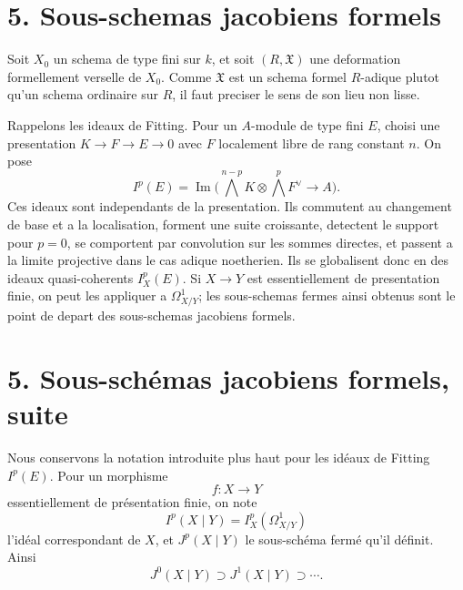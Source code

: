 \documentclass[11pt]{article}
\begin{document}
\section*{5. Sous-schemas jacobiens formels}

Soit \(X_0\) un schema de type fini sur \(k\), et soit \((R,\mathfrak X)\) une deformation formellement verselle de \(X_0\). Comme \(\mathfrak X\) est un schema formel \(R\)-adique plutot qu'un schema ordinaire sur \(R\), il faut preciser le sens de son lieu non lisse.

Rappelons les ideaux de Fitting. Pour un \(A\)-module de type fini \(E\), choisi une presentation \(K\to F\to E\to0\) avec \(F\) localement libre de rang constant \(n\). On pose
\[
 I^p(E)=\operatorname{Im}\bigl(\bigwedge^{n-p}K\otimes\bigwedge^{p}F^\vee\to A\bigr).
\]
Ces ideaux sont independants de la presentation. Ils commutent au changement de base et a la localisation, forment une suite croissante, detectent le support pour \(p=0\), se comportent par convolution sur les sommes directes, et passent a la limite projective dans le cas adique noetherien. Ils se globalisent donc en des ideaux quasi-coherents \(I^p_X(E)\). Si \(X\to Y\) est essentiellement de presentation finie, on peut les appliquer a \(\Omega^1_{X/Y}\); les sous-schemas fermes ainsi obtenus sont le point de depart des sous-schemas jacobiens formels.



\providecommand{\Der}{\operatorname{Der}}
\providecommand{\Supp}{\operatorname{Supp}}
\providecommand{\Ann}{\operatorname{Ann}}
\providecommand{\Fitt}{\operatorname{Fitt}}
\providecommand{\Jac}{\operatorname{Jac}}
\providecommand{\Frac}{\operatorname{Frac}}
\providecommand{\Sym}{\operatorname{Sym}}
\providecommand{\codim}{\operatorname{codim}}
\providecommand{\cJ}{\mathcal J}
\providecommand{\cI}{\mathcal I}
\providecommand{\cK}{\mathcal K}
\providecommand{\cM}{\mathcal M}
\providecommand{\cN}{\mathcal N}
\providecommand{\cX}{\mathfrak X}
\providecommand{\cY}{\mathfrak Y}
\providecommand{\cS}{\mathfrak S}
\providecommand{\cZ}{\mathfrak Z}
\providecommand{\Oo}{\mathcal O}
\providecommand{\widebar}{\overline}


\section*{5. Sous-schémas jacobiens formels, suite}

Nous conservons la notation introduite plus haut pour les idéaux de Fitting \(I^p(E)\).  Pour un morphisme
\[
        f:X\longrightarrow Y
\]
essentiellement de présentation finie, on note
\[
        I^p(X\mid Y)=I^p_X(\Omega^1_{X/Y})
\]
l'idéal correspondant de \(X\), et \(J^p(X\mid Y)\) le sous-schéma fermé qu'il définit.  Ainsi
\[
        J^0(X\mid Y)\supset J^1(X\mid Y)\supset\cdots .
\]
\end{document}
